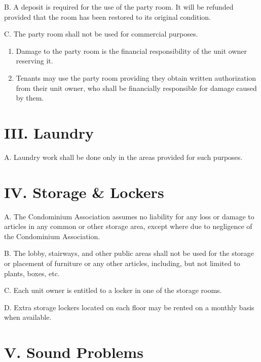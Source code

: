 \documentclass[
]{book}
\begin{document}
B. A deposit is required for the use of the party room. It will be refunded provided that the room has been restored to its original condition.

C. The party room shall not be used for commercial purposes.

\begin{enumerate}
\def\labelenumi{\arabic{enumi}.}
\item
  Damage to the party room is the financial responsibility of the unit owner reserving it.
\item
  Tenants may use the party room providing they obtain written authorization from their unit owner, who shall be financially responsible for damage caused by them.
\end{enumerate}

\hypertarget{iii.-laundry}{%
\section*{III. Laundry}\label{iii.-laundry}}

A. Laundry work shall be done only in the areas provided for such purposes.

\hypertarget{iv.-storage-lockers}{%
\section*{IV. Storage \& Lockers}\label{iv.-storage-lockers}}

A. The Condominium Association assumes no liability for any loss or damage to articles in any common or other storage area, except where due to negligence of the Condominium Association.

B. The lobby, stairways, and other public areas shall not be used for the storage or placement of furniture or any other articles, including, but not limited to plants, boxes, etc.

C. Each unit owner is entitled to a locker in one of the storage rooms.

D. Extra storage lockers located on each floor may be rented on a monthly basis when available.

\hypertarget{v.-sound-problems}{%
\section*{V. Sound Problems}\label{v.-sound-problems}}
\end{document}
